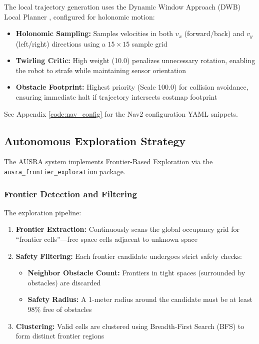 The local trajectory generation uses the Dynamic Window Approach (DWB) Local Planner \cite{fox1997dynamic}, configured for holonomic motion:
\begin{itemize}
    \item \textbf{Holonomic Sampling:} Samples velocities in both $v_x$ (forward/back) and $v_y$ (left/right) directions using a $15 \times 15$ sample grid
    \item \textbf{Twirling Critic:} High weight (10.0) penalizes unnecessary rotation, enabling the robot to strafe while maintaining sensor orientation
    \item \textbf{Obstacle Footprint:} Highest priority (Scale 100.0) for collision avoidance, ensuring immediate halt if trajectory intersects costmap footprint
\end{itemize}

See Appendix \ref{code:nav_config} for the Nav2 configuration YAML snippets.

\subsection{Autonomous Exploration Strategy}
\label{subsec:exploration}

The AUSRA system implements Frontier-Based Exploration via the \texttt{ausra\_frontier\_exploration} package.

\subsubsection{Frontier Detection and Filtering}

The exploration pipeline:
\begin{enumerate}
    \item \textbf{Frontier Extraction:} Continuously scans the global occupancy grid for ``frontier cells''---free space cells adjacent to unknown space
    \item \textbf{Safety Filtering:} Each frontier candidate undergoes strict safety checks:
    \begin{itemize}
        \item \textbf{Neighbor Obstacle Count:} Frontiers in tight spaces (surrounded by obstacles) are discarded
        \item \textbf{Safety Radius:} A 1-meter radius around the candidate must be at least 98\% free of obstacles
    \end{itemize}
    \item \textbf{Clustering:} Valid cells are clustered using Breadth-First Search (BFS) to form distinct frontier regions
\end{enumerate}

